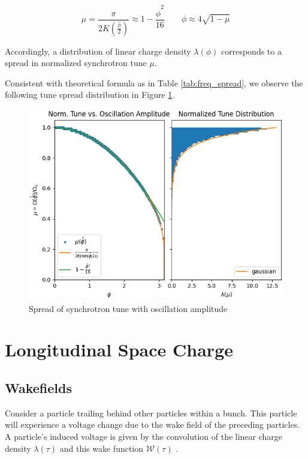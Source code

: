\begin{equation}
    \mu =\frac{\pi}{2K(\frac{\hat{\phi}}{2})} \approx 1-\frac{\hat{\phi}^2}{16} \qquad \phi \approx 4\sqrt{1-\mu}
    \label{eq:tune_spread}
\end{equation}

Accordingly, a distribution of linear charge density $\lambda(\phi)$ corresponds to a spread in normalized synchrotron tune $\mu$.



Consistent with theoretical formula as in Table \ref{tab:freq_spread}, we observe the following tune spread distribution in Figure \ref{fig:tune_spread}.

\begin{figure}
    \centering
    \includegraphics{figs/single_particle_motion/normalized_tune.png}
    \caption{Spread of synchrotron tune with oscillation amplitude}
    \label{fig:tune_spread}
\end{figure}

\section{Longitudinal Space Charge}

\subsection{Wakefields}

Consider a particle trailing behind other particles within a bunch. This particle will experience a voltage change due to the wake field of the preceding particles. A particle's induced voltage is given by the convolution of the linear charge density $\lambda(\tau)$ and this wake function $\mathcal{W}(\tau)$ \cite{wiedemann_particle_2015}\cite{zotter_impedances_1998}.


